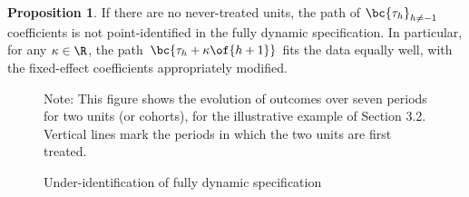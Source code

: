 \documentclass[12pt]{article}
\theoremstyle{definition}
\newtheorem{proposition}{Proposition}
\begin{document}
\begin{proposition}
    If there are no never-treated units, the path of $\bc{\tau_h}_{h \neq -1}$ coefficients is not point-identified in the fully dynamic specification. In particular, for any $\kappa \in \R$, the path $\bc{\tau_h + \kappa\of{h+1}}$ fits the data equally well, with the fixed-effect coefficients appropriately modified.
\end{proposition}

\begin{figure}[H]
    \noindent\caption{Under-identification of fully dynamic specification}
    \begin{center}
    \end{center}
    \medskip
    {\footnotesize Note: This figure shows the evolution of outcomes over seven periods for two units (or cohorts), for the illustrative example of Section 3.2. Vertical lines mark the periods in which the two units are first treated.}
    \label{borusyakRevisitingEventStudyDesigns2024_fig1}
\end{figure}
\end{document}
